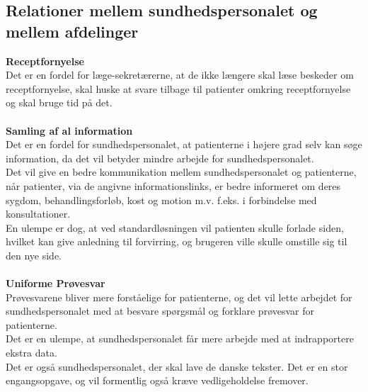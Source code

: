 \subsection{Relationer mellem sundhedspersonalet og mellem afdelinger}
\textbf{Receptfornyelse}\\
Det er en fordel for læge-sekretærerne, at de ikke længere skal læse beskeder om receptfornyelse, skal huske at svare tilbage til patienter omkring receptfornyelse og skal bruge tid på det.
\\\\
\textbf{Samling af al information}\\
Det er en fordel for sundhedspersonalet, at patienterne i højere grad selv kan søge information, da det vil betyder mindre arbejde for sundhedspersonalet.\\
Det vil give en bedre kommunikation mellem sundhedspersonalet og patienterne, når patienter, via de angivne informationslinks, er bedre informeret om deres sygdom, behandlingsforløb, kost og motion m.v. f.eks. i forbindelse med konsultationer.\\
En ulempe er dog, at ved standardløsningen vil patienten skulle forlade siden, hvilket kan give anledning til forvirring, og brugeren ville skulle omstille sig til den nye side. 
\\\\
\textbf{Uniforme Prøvesvar}\\
Prøvesvarene bliver mere forståelige for patienterne, og det vil lette arbejdet for sundhedspersonalet med at besvare spørgsmål og forklare prøvesvar for patienterne.\\
Det er en ulempe, at sundhedspersonalet får mere arbejde med at indrapportere ekstra data. \\
Det er også sundhedspersonalet, der skal lave de danske tekster. Det er en stor engangsopgave, og vil formentlig også kræve vedligeholdelse fremover.

